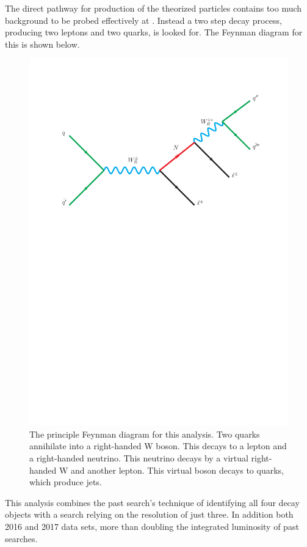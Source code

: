 The direct pathway for production of the theorized particles contains too much background to be probed effectively at \CMS.  Instead a two step decay process, producing two leptons and two quarks, is looked for.  The Feynman diagram for this is shown below.
\begin{figure}[!htbp]
    \centering
    \includegraphics[width=\textwidth]{figures/feynman.pdf}
    \caption[
        The decay process searched for.
    ]{
      The principle Feynman diagram for this analysis.  Two quarks annihilate into a right-handed W boson.  This decays to a lepton and a right-handed neutrino.  This neutrino decays by a virtual right-handed W and another lepton.  This virtual boson decays to quarks, which produce jets.
    }
    \label{fig:mainDiag}
\end{figure}
This analysis combines the past search's technique of identifying all four decay objects with a search relying on the resolution of just three. In addition both 2016 and 2017 data sets, more than doubling the integrated luminosity of past searches.

